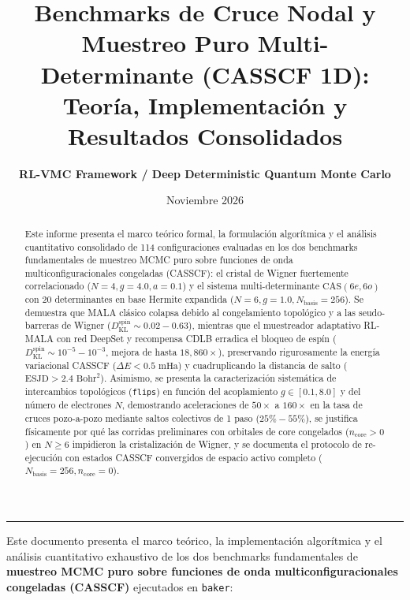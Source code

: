 \documentclass[10pt,a4paper]{article}
\title{\textbf{\Large Benchmarks de Cruce Nodal y Muestreo Puro Multi-Determinante (CASSCF 1D):\\
Teoría, Implementación y Resultados Consolidados}}
\author{\textbf{RL-VMC Framework / Deep Deterministic Quantum Monte Carlo}}
\date{Noviembre 2026}
\begin{document}
\maketitle

\begin{abstract}
Este informe presenta el marco teórico formal, la formulación algorítmica y el análisis cuantitativo consolidado de 114 configuraciones evaluadas en los dos benchmarks fundamentales de muestreo MCMC puro sobre funciones de onda multiconfiguracionales congeladas (CASSCF): el cristal de Wigner fuertemente correlacionado ($N=4, g=4.0, a=0.1$) y el sistema multi-determinante $\mathrm{CAS}(6e, 6o)$ con 20 determinantes en base Hermite expandida ($N=6, g=1.0, N_{\mathrm{basis}}=256$). Se demuestra que MALA clásico colapsa debido al congelamiento topológico y a las seudo-barreras de Wigner ($D_{\mathrm{KL}}^{\mathrm{spin}} \sim 0.02 - 0.63$), mientras que el muestreador adaptativo RL-MALA con red DeepSet y recompensa CDLB erradica el bloqueo de espín ($D_{\mathrm{KL}}^{\mathrm{spin}} \sim 10^{-5} - 10^{-3}$, mejora de hasta $18,860\times$), preservando rigurosamente la energía variacional CASSCF ($\Delta E < 0.5\text{ mHa}$) y cuadruplicando la distancia de salto ($\mathrm{ESJD} > 2.4\text{ Bohr}^2$). Asimismo, se presenta la caracterización sistemática de intercambios topológicos (\texttt{flips}) en función del acoplamiento $g \in [0.1, 8.0]$ y del número de electrones $N$, demostrando aceleraciones de $50\times$ a $160\times$ en la tasa de cruces pozo-a-pozo mediante saltos colectivos de 1 paso ($25\%-55\%$), se justifica físicamente por qué las corridas preliminares con orbitales de core congelados ($n_{\mathrm{core}} > 0$) en $N \ge 6$ impidieron la cristalización de Wigner, y se documenta el protocolo de re-ejecución con estados CASSCF convergidos de espacio activo completo ($N_{\mathrm{basis}}=256, n_{\mathrm{core}}=0$).
\end{abstract}

\tableofcontents
\vspace{0.8cm}
\hrule
\vspace{0.8cm}



Este documento presenta el marco teórico, la implementación algorítmica y el análisis cuantitativo exhaustivo de los dos benchmarks fundamentales de \textbf{muestreo MCMC puro sobre funciones de onda multiconfiguracionales congeladas (CASSCF)} ejecutados en \texttt{baker}:
\end{document}
